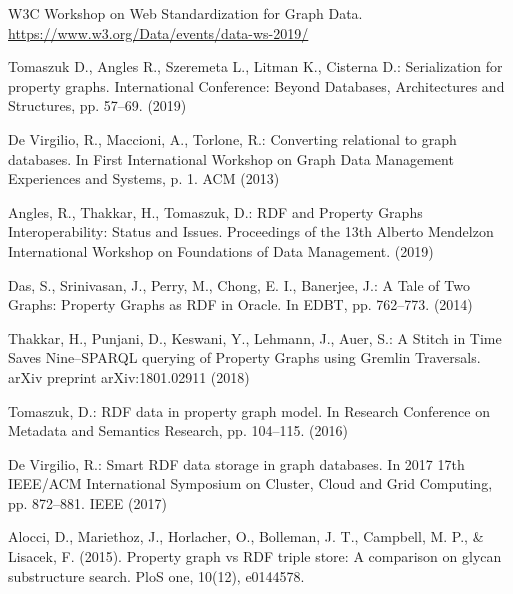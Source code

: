 \documentclass[runningheads]{llncs}
\begin{document}
\begin{thebibliography}{8}
W3C Workshop on Web Standardization for Graph Data. \url{https://www.w3.org/Data/events/data-ws-2019/}

Tomaszuk D., Angles R., Szeremeta L., Litman K., Cisterna D.:
Serialization for property graphs. International Conference: Beyond Databases, Architectures and Structures, pp. 57--69. (2019)

De Virgilio, R., Maccioni, A., Torlone, R.: Converting relational to graph databases. In First International Workshop on Graph Data Management Experiences and Systems, p. 1. ACM (2013)

Angles, R., Thakkar, H., Tomaszuk, D.: RDF and Property Graphs Interoperability: Status and Issues. Proceedings of the 13th Alberto Mendelzon International Workshop on Foundations of Data Management. (2019)

Das, S., Srinivasan, J., Perry, M., Chong, E. I., Banerjee, J.: A Tale of Two Graphs: Property Graphs as RDF in Oracle. In EDBT, pp. 762--773. (2014)

Thakkar, H., Punjani, D., Keswani, Y., Lehmann, J., Auer, S.: A Stitch in Time Saves Nine--SPARQL querying of Property Graphs using Gremlin Traversals. arXiv preprint arXiv:1801.02911 (2018)

Tomaszuk, D.: RDF data in property graph model. In Research Conference on Metadata and Semantics Research, pp. 104--115. (2016)

De Virgilio, R.: Smart RDF data storage in graph databases. In 2017 17th IEEE/ACM International Symposium on Cluster, Cloud and Grid Computing, pp. 872--881. IEEE (2017)

Alocci, D., Mariethoz, J., Horlacher, O., Bolleman, J. T., Campbell, M. P., & Lisacek, F. (2015). Property graph vs RDF triple store: A comparison on glycan substructure search. PloS one, 10(12), e0144578.






\end{thebibliography}
\end{document}
